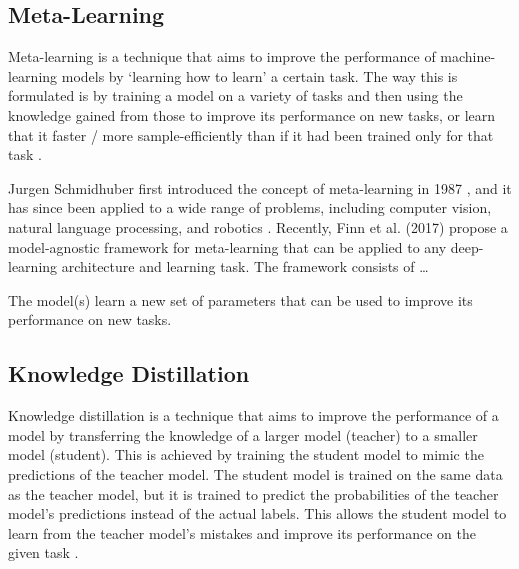 \documentclass[../main.tex]{subfiles}
\begin{document}
    \subsection{Meta-Learning} \label{sec:meta_learning} 

    
    Meta-learning is a technique that aims to improve the performance of machine-learning models by `learning how to learn' a certain task. The way this is formulated is by training a model on a variety of tasks and then using the knowledge gained from those to improve its performance on new tasks, or learn that it faster / more sample-efficiently than if it had been trained only for that task \cite{hospedales_meta-learning_2020}.
    
    Jurgen Schmidhuber first introduced the concept of meta-learning in 1987 \cite{schmidhuber_evolutionary_1987}, and it has since been applied to a wide range of problems, including computer vision, natural language processing, and robotics \cite{hospedales_meta-learning_2020}. Recently, Finn et al. (2017) \cite{finn_model-agnostic_2017} propose a model-agnostic framework for meta-learning that can be applied to any deep-learning architecture and learning task. The framework consists of \dots
    
    The model(s) learn a new set of parameters that can be used to improve its performance on new tasks.


    \subsection{Knowledge Distillation} \label{sec:knowledge_distillation}

    Knowledge distillation is a technique that aims to improve the performance of a model by transferring the knowledge of a larger model (teacher) to a smaller model (student). This is achieved by training the student model to mimic the predictions of the teacher model. The student model is trained on the same data as the teacher model, but it is trained to predict the probabilities of the teacher model's predictions instead of the actual labels. This allows the student model to learn from the teacher model's mistakes and improve its performance on the given task \cite{hinton_distilling_2015}.
    
    
\end{document}
